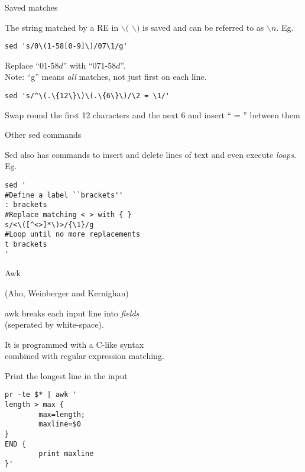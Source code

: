 \begin{slide}{}
Saved matches

The string matched by a RE in $\backslash ($ $\backslash )$ is saved and can be
referred to as $\backslash n$.  Eg.

\begin{verbatim}
sed 's/0\(1-58[0-9]\)/07\1/g'
\end{verbatim}

Replace ``01-58$d$'' with ``071-58$d$''. \\
Note: ``g'' means {\em all} matches, not just first on each line.

\begin{verbatim}
sed 's/^\(.\{12\}\)\(.\{6\}\)/\2 = \1/'
\end{verbatim}

Swap round the first 12 characters and the next 6 and insert `` = ''
between them
\end{slide}

\begin{slide}{}
Other sed commands

\vspace{3cm}

Sed also has commands to insert and delete lines of text and even
execute {\em loops}.  Eg.

\begin{verbatim}
sed '
#Define a label ``brackets''
: brackets
#Replace matching < > with { }
s/<\([^<>]*\)>/{\1}/g
#Loop until no more replacements
t brackets
'
\end{verbatim}

\end{slide}

\begin{slide}{}
Awk

(Aho, Weinberger and Kernighan)

\vspace{3cm}

awk breaks each input line into {\em fields} \\
(seperated by white-space).

It is programmed with a C-like syntax \\
combined with regular expression matching.
\end{slide}

\begin{slide}{}
Print the longest line in the input

\begin{verbatim}
pr -te $* | awk '
length > max {
        max=length;
        maxline=$0
}
END {
        print maxline
}'
\end{verbatim}
\end{slide}


